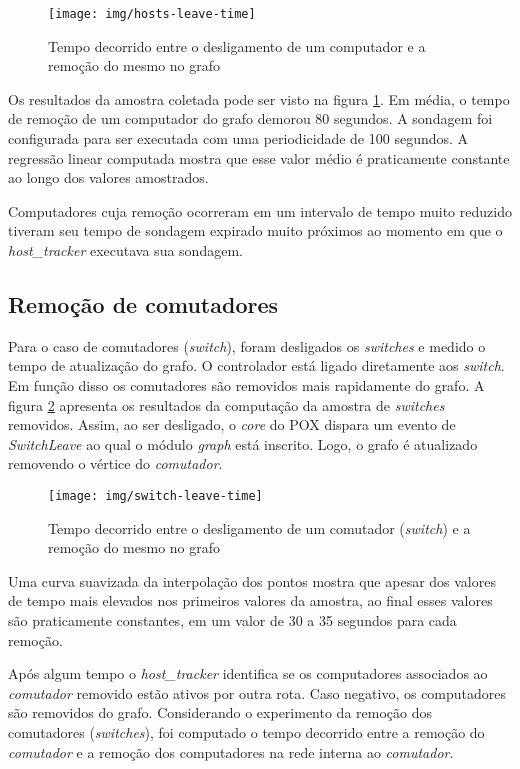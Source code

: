 \begin{figure}[h!]
    \centering
    \label{fig:hosts-leave-time}
    \texttt{[image: img/hosts-leave-time]}
    \caption{Tempo decorrido entre o desligamento de um computador e a
    remoção do mesmo no grafo}
\end{figure}

Os resultados da amostra coletada pode ser visto na figura
\ref{fig:hosts-leave-time}.
Em média, o tempo de remoção de um computador do grafo demorou 80 segundos.
A sondagem foi configurada para ser executada com uma periodicidade de 100
segundos.
A regressão linear computada mostra que esse valor médio é praticamente
constante ao longo dos valores amostrados.

Computadores cuja remoção ocorreram em um intervalo de tempo muito reduzido
tiveram seu tempo de sondagem expirado muito próximos ao momento em que
o \emph{host\_tracker} executava sua sondagem.

\subsection{Remoção de comutadores}

Para o caso de comutadores (\emph{switch}), foram desligados os
\emph{switches} e medido o tempo de atualização do grafo.
O controlador está ligado diretamente aos \emph{switch}.
Em função disso os comutadores são removidos mais rapidamente do grafo.
A figura \ref{fig:switch-leave-time} apresenta os resultados da
computação da amostra de \emph{switches} removidos.
Assim, ao ser desligado, o \emph{core} do POX dispara um evento
de \emph{SwitchLeave} ao qual o módulo \emph{graph} está inscrito.
Logo, o grafo é atualizado removendo o vértice do \emph{comutador}.

\begin{figure}[h!]
    \centering
    \label{fig:switch-leave-time}
    \texttt{[image: img/switch-leave-time]}
    \caption{Tempo decorrido entre o desligamento de um comutador
    (\emph{switch}) e a remoção do mesmo no grafo}
\end{figure}

Uma curva suavizada da interpolação dos pontos mostra que apesar dos valores
de tempo mais elevados nos primeiros valores da amostra, ao final esses valores
são praticamente constantes, em um valor de 30 a 35 segundos para cada
remoção.

Após algum tempo o \emph{host\_tracker} identifica se os computadores
associados ao \emph{comutador} removido estão ativos por outra rota.
Caso negativo, os computadores são removidos do grafo.
Considerando o experimento da remoção dos comutadores (\emph{switches}),
foi computado o tempo decorrido entre a remoção do \emph{comutador} e a
remoção dos computadores na rede interna ao \emph{comutador}.

